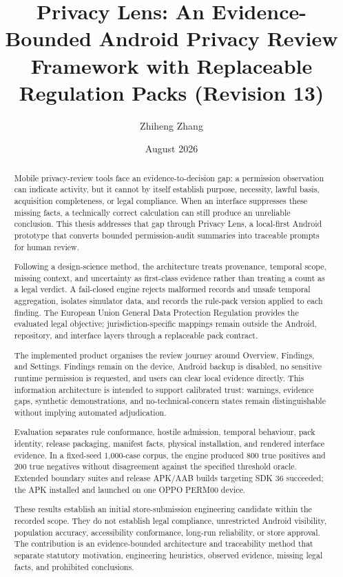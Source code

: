 \documentclass[11pt,a4paper]{article}
\title{Privacy Lens: An Evidence-Bounded Android Privacy Review Framework with Replaceable Regulation Packs (Revision 13)}
\author{Zhiheng Zhang}
\date{August 2026}
\begin{document}
\maketitle
\begin{abstract}
Mobile privacy-review tools face an evidence-to-decision gap: a permission observation can indicate activity, but it cannot by itself establish purpose, necessity, lawful basis, acquisition completeness, or legal compliance. When an interface suppresses these missing facts, a technically correct calculation can still produce an unreliable conclusion. This thesis addresses that gap through Privacy Lens, a local-first Android prototype that converts bounded permission-audit summaries into traceable prompts for human review.

Following a design-science method, the architecture treats provenance, temporal scope, missing context, and uncertainty as first-class evidence rather than treating a count as a legal verdict. A fail-closed engine rejects malformed records and unsafe temporal aggregation, isolates simulator data, and records the rule-pack version applied to each finding. The European Union General Data Protection Regulation provides the evaluated legal objective; jurisdiction-specific mappings remain outside the Android, repository, and interface layers through a replaceable pack contract.

The implemented product organises the review journey around Overview, Findings, and Settings. Findings remain on the device, Android backup is disabled, no sensitive runtime permission is requested, and users can clear local evidence directly. This information architecture is intended to support calibrated trust: warnings, evidence gaps, synthetic demonstrations, and no-technical-concern states remain distinguishable without implying automated adjudication.

Evaluation separates rule conformance, hostile admission, temporal behaviour, pack identity, release packaging, manifest facts, physical installation, and rendered interface evidence. In a fixed-seed 1,000-case corpus, the engine produced 800 true positives and 200 true negatives without disagreement against the specified threshold oracle. Extended boundary suites and release APK/AAB builds targeting SDK 36 succeeded; the APK installed and launched on one OPPO PERM00 device.

These results establish an initial store-submission engineering candidate within the recorded scope. They do not establish legal compliance, unrestricted Android visibility, population accuracy, accessibility conformance, long-run reliability, or store approval. The contribution is an evidence-bounded architecture and traceability method that separate statutory motivation, engineering heuristics, observed evidence, missing legal facts, and prohibited conclusions.
\end{abstract}
\newpage
\tableofcontents
\newpage









\end{document}
